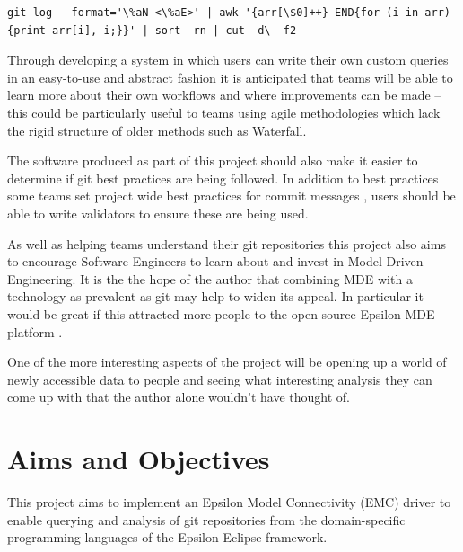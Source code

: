 \documentclass[11pt]{book}
\begin{document}
\begin{lstlisting}[caption=List Authors by Number of Commits in Git Bash, label=lst:gitbash]
git log --format='\%aN <\%aE>' | awk '{arr[\$0]++} END{for (i in arr){print arr[i], i;}}' | sort -rn | cut -d\ -f2-
\end{lstlisting}

Through developing a system in which users can write their own custom queries in an easy-to-use and abstract fashion it is anticipated that teams will be able to learn more about their own workflows and where improvements can be made -- this could be particularly useful to teams using agile methodologies which lack the rigid structure of older methods such as Waterfall.

The software produced as part of this project should also make it easier to determine if git best practices \cite{gitbestpractices} are being followed. In addition to best practices some teams set project wide best practices for commit messages \cite{erlanggitcommitmessages}, users should be able to write validators to ensure these are being used.

As well as helping teams understand their git repositories this project also aims to encourage Software Engineers to learn about and invest in Model-Driven Engineering. It is the the hope of the author that combining MDE with a technology as prevalent as git may help to widen its appeal. In particular it would be great if this attracted more people to the open source Epsilon MDE platform \cite{epsilonhomepage}.

One of the more interesting aspects of the project will be opening up a world of newly accessible data to people and seeing what interesting analysis they can come up with that the author alone wouldn't have thought of.

\section{Aims and Objectives}
\label{aimsandobjectives} 
This project aims to implement an Epsilon Model Connectivity (EMC) driver to enable querying and analysis of git repositories from the domain-specific programming languages of the Epsilon Eclipse framework.
\end{document}
